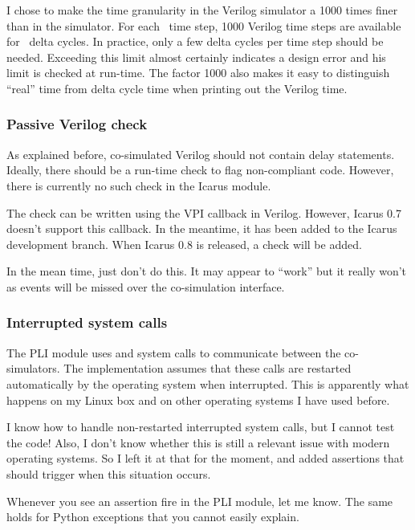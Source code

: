 I chose to make the time granularity in the Verilog simulator a 1000
times finer than in the \myhdl{} simulator. For each \myhdl\ time
step, 1000 Verilog time steps are available for \myhdl\ delta
cycles. In practice, only a few delta cycles per time step should be
needed. Exceeding this limit almost certainly indicates a design error
and his limit is checked at run-time. The factor 1000 also makes it
easy to distinguish ``real'' time from delta cycle time when printing
out the Verilog time.

\subsubsection{Passive Verilog check}

As explained before, co-simulated Verilog should not contain delay
statements. Ideally, there should be a run-time check to flag
non-compliant code. However, there is currently no such check in the Icarus
module.

The check can be written using the  VPI callback
in Verilog. However, Icarus 0.7 doesn't support this callback. In
the meantime, it has been added to the Icarus development branch.  When
Icarus 0.8 is released, a check will be added.

In the mean time, just don't do this. It may appear to ``work'' but it
really won't as events will be missed over the co-simulation
interface.

\subsubsection{Interrupted system calls}

The PLI module uses  and  system calls to
communicate between the co-simulators. The implementation assumes that
these calls are restarted automatically by the operating system when
interrupted. This is apparently what happens on my Linux box and on
other operating systems I have used before.

I know how to handle non-restarted interrupted system calls, but I
cannot test the code! Also, I don't know whether this is still a
relevant issue with modern operating systems. So I left it
at that for the moment, and added assertions that should trigger
when this situation occurs.

Whenever you see an assertion fire in the PLI module, let me
know. The same holds for Python exceptions that you cannot
easily explain.


